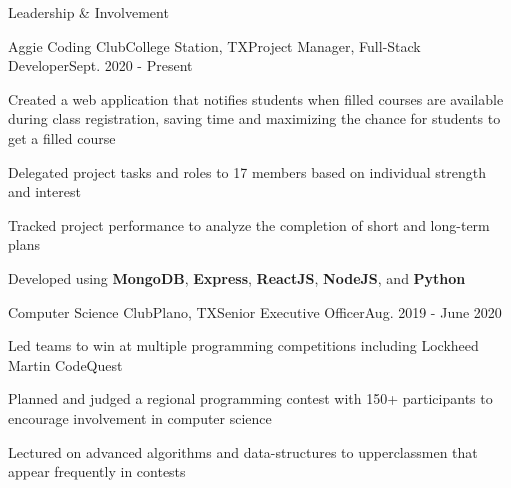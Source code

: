 \documentclass{resume} %
\begin{document}
\begin{rSection}{Leadership \& Involvement}
\begin{rSubsection}{Aggie Coding Club}{College Station, TX}{Project Manager, Full-Stack Developer}{Sept. 2020 - Present}
    \item Created a web application that notifies students when filled courses are available during class registration, saving time and maximizing the chance for students to get a filled course
    \item Delegated project tasks and roles to 17 members based on individual strength and interest
    \item Tracked project performance to analyze the completion of short and long-term plans
    \item Developed using \textbf{MongoDB}, \textbf{Express}, \textbf{ReactJS}, \textbf{NodeJS}, and \textbf{Python}
\end{rSubsection}

\begin{rSubsection}{Computer Science Club}{Plano, TX}{Senior Executive Officer}{Aug. 2019 - June 2020}
    \item Led teams to win at multiple programming competitions including Lockheed Martin CodeQuest
    \item Planned and judged a regional programming contest with 150+ participants to encourage involvement in computer science
    \item Lectured on advanced algorithms and data-structures to upperclassmen that appear frequently in contests
\end{rSubsection}
\end{rSection}


\end{document}
